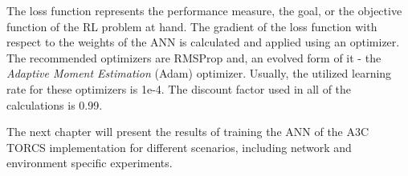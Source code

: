 The loss function represents the performance measure, the goal, or the objective function of the RL problem at hand. The gradient of the loss function with respect to the weights of the ANN is calculated and applied using an optimizer. The recommended optimizers are RMSProp and, an evolved form of it - the \textit{Adaptive Moment Estimation} (Adam) optimizer. Usually, the utilized learning rate for these optimizers is 1e-4. The discount factor used in all of the calculations is 0.99.

The next chapter will present the results of training the ANN of the A3C TORCS implementation for different scenarios, including network and environment specific experiments.